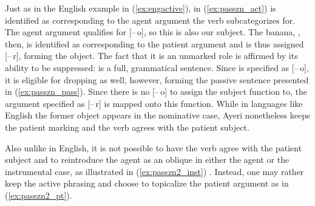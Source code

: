 Just as in the English example in (\ref{ex:engactive}),  in
(\ref{ex:passzn_act}) is identified as corresponding to the agent argument the
verb  subcategorizes for. The agent argument qualifies
for [–\,o], so this is also our subject. The banana, , then,
is identified as corresponding to the patient argument and is thus assigned
[–\,r], forming the object. The fact that it is an unmarked role is affirmed by
its ability to be suppressed:  is a full, grammatical sentence. Since  is specified
as [–\,o], it is eligible for dropping as well, however, forming the passive
sentence presented in (\ref{ex:passzn_pass}). Since there is no [–\,o] to
assign the subject function to, the argument specified as [–\,r] is mapped onto
this function. While in languages like English the former object appears in the
nominative case, Ayeri nonetheless keeps the patient marking and the verb
agrees with the patient subject.

Also unlike in English, it is not possible to have the verb agree with the
patient subject and to reintroduce the agent as an oblique in either the agent
or the instrumental case, as illustrated in (\ref{ex:passzn2_inst}) \parencite
[for English, compare][416]{needhamtoivonen2011}. Instead, one may rather keep
the active phrasing and choose to topicalize the patient argument as
in (\ref{ex:passzn2_pt}).

